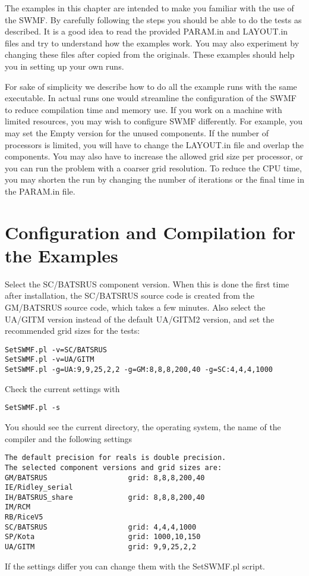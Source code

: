 The examples in this chapter are intended to make you familiar
with the use of the SWMF. By carefully following the steps you should
be able to do the tests as described. It is a good idea to read the
provided PARAM.in and LAYOUT.in files and try to understand how
the examples work. You may also experiment by changing these files
after copied from the originals. These examples should help you
in setting up your own runs.

For sake of simplicity we describe how to do all the example runs with the
same executable. In actual runs one would streamline the configuration
of the SWMF to reduce compilation time and memory use. If you work
on a machine with limited resources, you may wish to configure SWMF
differently. For example, you may set the Empty version for the unused
components. If the number of processors is limited, you will have to
change the LAYOUT.in file and overlap the components. You may also have to 
increase the allowed grid size per processor, or you can run the problem with 
a coarser grid resolution. To reduce the CPU time, you may shorten the 
run by changing the number of iterations or the final time in the 
PARAM.in file.

\section{Configuration and Compilation for the Examples}

Select the SC/BATSRUS component version. When this is done the first time
after installation, the SC/BATSRUS source code is created from the GM/BATSRUS
source code, which takes a few minutes. Also select 
the UA/GITM version instead of the default UA/GITM2 version, 
and set the recommended grid sizes for the tests:
\begin{verbatim}
SetSWMF.pl -v=SC/BATSRUS
SetSWMF.pl -v=UA/GITM
SetSWMF.pl -g=UA:9,9,25,2,2 -g=GM:8,8,8,200,40 -g=SC:4,4,4,1000
\end{verbatim}
Check the current settings with
\begin{verbatim}
SetSWMF.pl -s
\end{verbatim}
You should see the current directory, the operating system, the name
of the compiler and the following settings
\begin{verbatim}
The default precision for reals is double precision.
The selected component versions and grid sizes are:
GM/BATSRUS                   grid: 8,8,8,200,40
IE/Ridley_serial             
IH/BATSRUS_share             grid: 8,8,8,200,40
IM/RCM                       
RB/RiceV5                    
SC/BATSRUS                   grid: 4,4,4,1000
SP/Kota                      grid: 1000,10,150
UA/GITM                      grid: 9,9,25,2,2
\end{verbatim}
If the settings differ you can change them with the SetSWMF.pl script.

